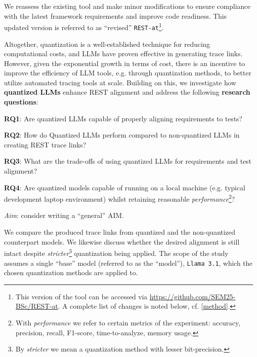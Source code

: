 \documentclass[conference]{IEEEtran}
\begin{document}
We reassess the existing tool and make minor modifications to ensure compliance
with the latest framework requirements and improve code readiness. This updated
version is referred to as ``revised'' \verb|REST-at|\footnote{This version of
the tool can be accessed via \url{https://github.com/SEM25-BSc/REST-at}. A
complete list of changes is noted below, cf. \ref{method}.}.

Altogether, quantization is a well-established technique for reducing
computational costs, and LLMs have proven effective in generating trace links.
However, given the exponential growth in terms of cost, there is an incentive to
improve the efficiency of LLM tools, e.g. through quantization methods, to
better utilize automated tracing tools at scale. Building on this, we
investigate how \textbf{quantized LLMs} enhance REST alignment and address the
following \textbf{research questions}:

\begin{RQBox}
\noindent
\textbf{RQ1}: Are quantized LLMs capable of properly aligning requirements to tests?

\noindent
\textbf{RQ2}: How do Quantized LLMs perform compared to non-quantized LLMs in creating REST trace links?

\noindent
\textbf{RQ3}: What are the trade-offs of using quantized LLMs for requirements and test alignment?

\noindent
\textbf{RQ4}: Are quantized models capable of running on a local machine (e.g. typical development laptop environment) whilst retaining reasonable \textit{performance}\footnote{With \textit{performance} we refer to certain metrics of the experiment: accuracy, precision, recall, F1-score, time-to-analyze, memory usage.}?

\textit{Aim}: consider writing a ``general'' AIM.

\end{RQBox}

We compare the produced trace links from quantized and the non-quantized
counterpart models. We likewise discuss whether the desired alignment is still
intact despite \textit{stricter}\footnote{By \textit{stricter} we mean a
quantization method with lesser bit-precision.} quantization being applied.  The
scope of the study assumes a single ``base'' model (referred to as the
``model''), \verb|Llama 3.1|, which the chosen quantization methods are applied
to.
\end{document}
